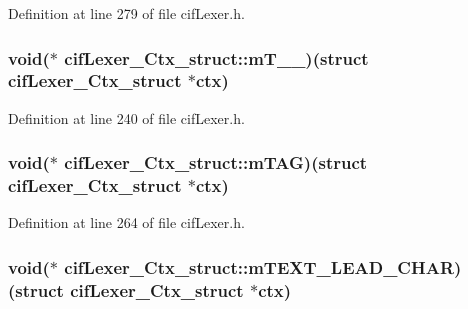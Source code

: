 Definition at line 279 of file cif\-Lexer.\-h.

\hypertarget{structcif_lexer___ctx__struct_a3b93d4ea69d057a181e0e837fa62b381}{
\subsubsection[{m\-T\-\_\-\-\_\-37}]{\setlength{\rightskip}{0pt plus 5cm}void($\ast$ cif\-Lexer\-\_\-\-Ctx\-\_\-struct\-::m\-T\-\_\-\-\_)(struct {\bf cif\-Lexer\-\_\-\-Ctx\-\_\-struct} $\ast$ctx)}}\label{structcif_lexer___ctx__struct_a3b93d4ea69d057a181e0e837fa62b381}


Definition at line 240 of file cif\-Lexer.\-h.

\hypertarget{structcif_lexer___ctx__struct_a42dfe1993d64101fc94d7b905e297bd5}{
\subsubsection[{m\-T\-A\-G}]{\setlength{\rightskip}{0pt plus 5cm}void($\ast$ cif\-Lexer\-\_\-\-Ctx\-\_\-struct\-::m\-T\-A\-G)(struct {\bf cif\-Lexer\-\_\-\-Ctx\-\_\-struct} $\ast$ctx)}}\label{structcif_lexer___ctx__struct_a42dfe1993d64101fc94d7b905e297bd5}


Definition at line 264 of file cif\-Lexer.\-h.

\hypertarget{structcif_lexer___ctx__struct_a6b3064d0e1e1057869d7aeb037b1f2ae}{
\subsubsection[{m\-T\-E\-X\-T\-\_\-\-L\-E\-A\-D\-\_\-\-C\-H\-A\-R}]{\setlength{\rightskip}{0pt plus 5cm}void($\ast$ cif\-Lexer\-\_\-\-Ctx\-\_\-struct\-::m\-T\-E\-X\-T\-\_\-\-L\-E\-A\-D\-\_\-\-C\-H\-A\-R)(struct {\bf cif\-Lexer\-\_\-\-Ctx\-\_\-struct} $\ast$ctx)}}\label{structcif_lexer___ctx__struct_a6b3064d0e1e1057869d7aeb037b1f2ae}


